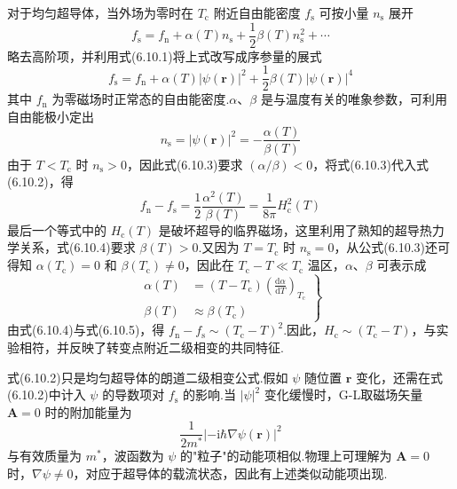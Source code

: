 对于均匀超导体，当外场为零时在 $T_{\mathrm{c}}$ 附近自由能密度 $f_{\mathrm{s}}$ 可按小量 $n_{\mathrm{s}}$ 展开
\begin{equation*}
  f_{\mathrm{s}}=f_{\mathrm{n}}+\alpha(T)n_{\mathrm{s}}
  +\frac{1}{2}\beta(T)n_{\mathrm{s}}^{2}+\cdots
\end{equation*}
略去高阶项，并利用式(6.10.1)将上式改写成序参量的展式
\begin{equation}
  f_{\mathrm{s}}=f_{\mathrm{n}}+\alpha(T)|\psi(\boldsymbol{r})|^{2}
  +\frac{1}{2}\beta(T)|\psi(\boldsymbol{r})|^{4}
\end{equation}
其中 $f_{\mathrm{n}}$ 为零磁场时正常态的自由能密度.$\alpha$、$\beta$ 是与温度有关的唯象参数，可利用自由能极小定出
\begin{equation}
  n_{\mathrm{s}}=|\psi(\boldsymbol{r})|^{2}
  =-\frac{\alpha(T)}{\beta(T)}
\end{equation}
由于 $T<T_{\mathrm{c}}$ 时 $n_{\mathrm{s}}>0$，因此式(6.10.3)要求 $\left(\alpha/\beta\right)<0$，将式(6.10.3)代入式(6.10.2)，得
\begin{equation}
  f_{\mathrm{n}}-f_{\mathrm{s}}=\frac{1}{2}\frac{\alpha^{2}(T)}{\beta(T)}
  =\frac{1}{8\pi}H_{\mathrm{c}}^{2}(T)
\end{equation}
最后一个等式中的 $H_{\mathrm{c}}(T)$ 是破坏超导的临界磁场，这里利用了熟知的超导热力学关系，式(6.10.4)要求 $\beta(T)>0$.又因为 $T=T_{\mathrm{c}}$ 时 $n_{\mathrm{s}}=0$，从公式(6.10.3)还可得知 $\alpha(T_{\mathrm{c}})=0$ 和 $\beta(T_{\mathrm{c}})\neq0$，因此在 $T_{\mathrm{c}}-T\ll T_{\mathrm{c}}$ 温区，$\alpha$、$\beta$ 可表示成
\begin{equation}
  \left.
  \begin{aligned}
    \alpha(T)&=\left(T-T_{\mathrm{c}}\right)
    \left(\frac{\mathrm{d}\alpha}{\mathrm{d}T}\right)_{T_{\mathrm{c}}}\\
    \beta(T)&\approx\beta\left(T_{\mathrm{c}}\right)
  \end{aligned}\right\}
\end{equation}
由式(6.10.4)与式(6.10.5)，得 $f_{\mathrm{n}}-f_{\mathrm{s}}\sim\left(T_{\mathrm{c}}-T\right)^{2}$.因此，$H_{\mathrm{c}}\sim\left(T_{\mathrm{c}}-T\right)$，与实验相符，并反映了转变点附近二级相变的共同特征.

式(6.10.2)只是均匀超导体的朗道二级相变公式.假如 $\psi$ 随位置 $\boldsymbol{r}$ 变化，还需在式(6.10.2)中计入 $\psi$ 的导数项对 $f_{\mathrm{s}}$ 的影响.当 $|\psi|^{2}$ 变化缓慢时，G-L取磁场矢量 $\boldsymbol{A}=0$ 时的附加能量为
\begin{equation*}
  \frac{1}{2m^{*}}\left|-\mathrm{i}\hbar\nabla\psi(\boldsymbol{r})\right|^{2}
\end{equation*}
与有效质量为 $m^{*}$，波函数为 $\psi$ 的"粒子"的动能项相似.物理上可理解为 $\boldsymbol{A}=0$ 时，$\nabla\psi\neq0$，对应于超导体的载流状态，因此有上述类似动能项出现.

